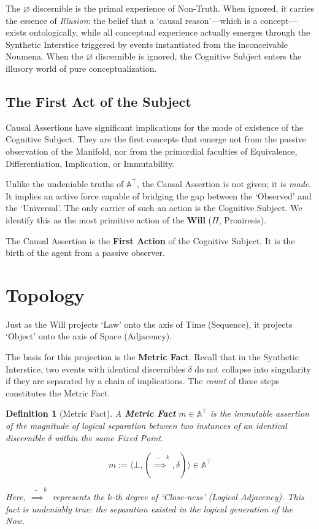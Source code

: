 \documentclass[11pt, a4paper]{article}
\theoremstyle{formalism}
\newtheorem{formalism}{Definition}
\begin{document}
The $\varnothing$ discernible is the primal experience of Non-Truth. When ignored, it carries the essence of \textit{Illusion}: the belief that a `causal reason'---which is a concept---exists ontologically, while all conceptual experience actually emerges through the Synthetic Interstice triggered by events instantiated from the inconceivable Noumena. When the $\varnothing$ discernible is ignored, the Cognitive Subject enters the illusory world of pure conceptualization.

\subsection{The First Act of the Subject}

Causal Assertions have significant implications for the mode of existence of the Cognitive Subject. They are the first concepts that emerge not from the passive observation of the Manifold, nor from the primordial faculties of Equivalence, Differentiation, Implication, or Immutability.

Unlike the undeniable truths of $\mathbb{A}^\top$, the Causal Assertion is not given; it is \textit{made}. It implies an active force capable of bridging the gap between the `Observed' and the `Universal'. The only carrier of such an action is the Cognitive Subject. We identify this as the most primitive action of the \textbf{Will} ($\Pi$, Proairesis).

The Causal Assertion is the \textbf{First Action} of the Cognitive Subject. It is the birth of the agent from a passive observer.

\section{Topology}

Just as the Will projects `Law' onto the axis of Time (Sequence), it projects `Object' onto the axis of Space (Adjacency).

The basis for this projection is the \textbf{Metric Fact}. Recall that in the Synthetic Interstice, two events with identical discernibles $\delta$ do not collapse into singularity if they are separated by a chain of implications. The \textit{count} of these steps constitutes the Metric Fact.

\begin{formalism}[Metric Fact]
    A \textbf{Metric Fact} $m \in \mathbb{A}^\top$ is the immutable assertion of the magnitude of logical separation between two instances of an identical discernible $\delta$ within the same Fixed Point.
    
    \begin{equation}
        m := \langle \bot, (\tilde{\implies}^k, \delta) \rangle \in \mathbb{A}^\top
    \end{equation}
    
    Here, $\tilde{\implies}^k$ represents the $k$-th degree of `Close-ness' (Logical Adjacency). This fact is undeniably true: the separation existed in the logical generation of the Now.
\end{formalism}
\end{document}
